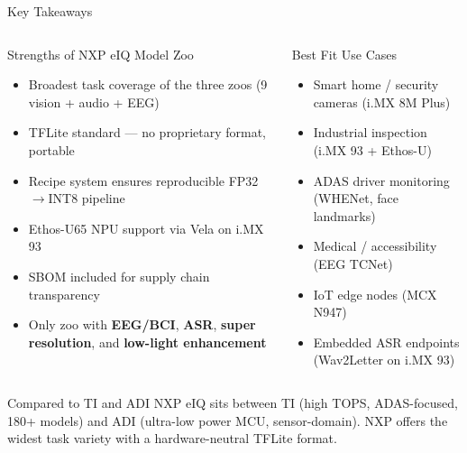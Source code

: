 \documentclass[aspectratio=169]{beamer}
\begin{document}
\begin{frame}{Key Takeaways}
  \begin{columns}[T]
      \begin{block}{Strengths of NXP eIQ Model Zoo}
        \begin{itemize}
          \item \alert{Broadest task coverage} of the three zoos (9 vision + audio + EEG)
          \item \alert{TFLite standard} — no proprietary format, portable
          \item \alert{Recipe system} ensures reproducible FP32$\to$INT8 pipeline
          \item \alert{Ethos-U65 NPU} support via Vela on i.MX 93
          \item \alert{SBOM} included for supply chain transparency
          \item Only zoo with \textbf{EEG/BCI}, \textbf{ASR}, \textbf{super resolution}, and \textbf{low-light enhancement}
        \end{itemize}
      \end{block}
      \begin{block}{Best Fit Use Cases}
        \begin{itemize}
          \item Smart home / security cameras (i.MX 8M Plus)
          \item Industrial inspection (i.MX 93 + Ethos-U)
          \item ADAS driver monitoring (WHENet, face landmarks)
          \item Medical / accessibility (EEG TCNet)
          \item IoT edge nodes (MCX N947)
          \item Embedded ASR endpoints (Wav2Letter on i.MX 93)
        \end{itemize}
      \end{block}
  \end{columns}
  \vspace{6pt}
  \begin{alertblock}{Compared to TI and ADI}
    NXP eIQ sits between TI (high TOPS, ADAS-focused, 180+ models) and ADI (ultra-low power MCU, sensor-domain). NXP offers the widest task variety with a hardware-neutral TFLite format.
  \end{alertblock}
\end{frame}
\end{document}
